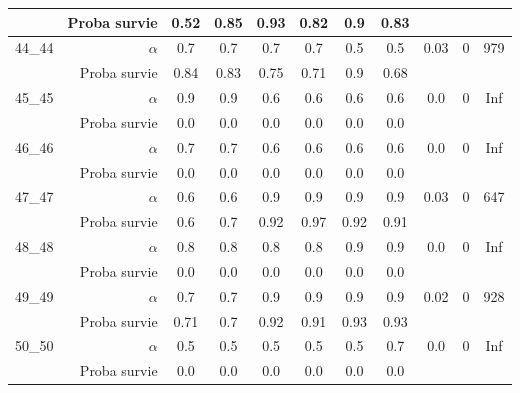 \documentclass[main.tex]{subfiles}
\begin{document}
\begin{center}
\begin{tabular}{|c||r|c|c|c|c|c|c||c|c|c|}
&Proba survie &0.52 &0.85 &0.93 &0.82 &0.9 &0.83 && &\\
\hline\hline
44_44 &$\alpha$&0.7 &0.7 &0.7 &0.7 &0.5 &0.5 &0.03 &0 &979\\
&Proba survie &0.84 &0.83 &0.75 &0.71 &0.9 &0.68 && &\\
\hline\hline
45_45 &$\alpha$&0.9 &0.9 &0.6 &0.6 &0.6 &0.6 &0.0 &0 &Inf\\
&Proba survie &0.0 &0.0 &0.0 &0.0 &0.0 &0.0 && &\\
\hline\hline
46_46 &$\alpha$&0.7 &0.7 &0.6 &0.6 &0.6 &0.6 &0.0 &0 &Inf\\
&Proba survie &0.0 &0.0 &0.0 &0.0 &0.0 &0.0 && &\\
\hline\hline
47_47 &$\alpha$&0.6 &0.6 &0.9 &0.9 &0.9 &0.9 &0.03 &0 &647\\
&Proba survie &0.6 &0.7 &0.92 &0.97 &0.92 &0.91 && &\\
\hline\hline
48_48 &$\alpha$&0.8 &0.8 &0.8 &0.8 &0.9 &0.9 &0.0 &0 &Inf\\
&Proba survie &0.0 &0.0 &0.0 &0.0 &0.0 &0.0 && &\\
\hline\hline
49_49 &$\alpha$&0.7 &0.7 &0.9 &0.9 &0.9 &0.9 &0.02 &0 &928\\
&Proba survie &0.71 &0.7 &0.92 &0.91 &0.93 &0.93 && &\\
\hline\hline
50_50 &$\alpha$&0.5 &0.5 &0.5 &0.5 &0.5 &0.7 &0.0 &0 &Inf\\
&Proba survie &0.0 &0.0 &0.0 &0.0 &0.0 &0.0 && &\\
\hline
    \end{tabular}
	\end{center}
	
\end{document}
